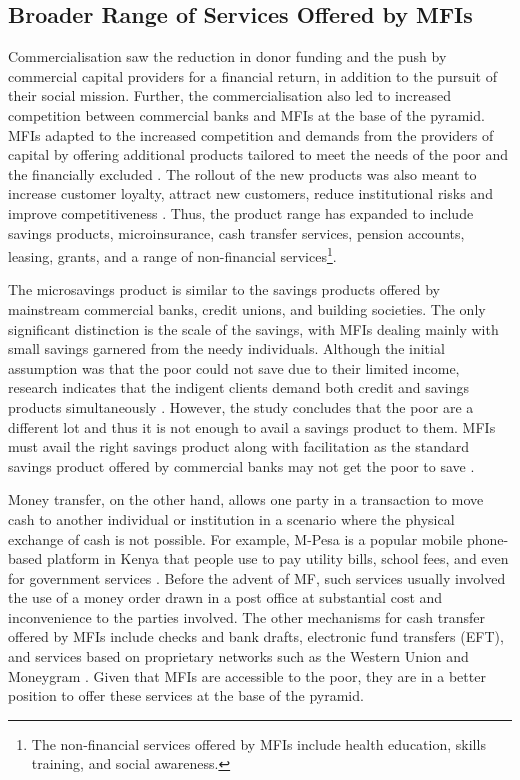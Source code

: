 \documentclass[a4paper, nobind]{templates/ociamthesis}
\begin{document}
\hypertarget{broader-range-of-services-offered-by-mfis}{%
\subsection{Broader Range of Services Offered by MFIs}\label{broader-range-of-services-offered-by-mfis}}

\noindent Commercialisation saw the reduction in donor funding and the push by commercial capital providers for a financial return, in addition to the pursuit of their social mission. Further, the commercialisation also led to increased competition between commercial banks and MFIs at the base of the pyramid. MFIs adapted to the increased competition and demands from the providers of capital by offering additional products tailored to meet the needs of the poor and the financially excluded \autocite{cozarenco2016type}. The rollout of the new products was also meant to increase customer loyalty, attract new customers, reduce institutional risks and improve competitiveness \autocite{churchill2012making}. Thus, the product range has expanded to include savings products, microinsurance, cash transfer services, pension accounts, leasing, grants, and a range of non-financial services\footnote{The non-financial services offered by MFIs include health education, skills training, and social awareness.}.

The microsavings product is similar to the savings products offered by mainstream commercial banks, credit unions, and building societies. The only significant distinction is the scale of the savings, with MFIs dealing mainly with small savings garnered from the needy individuals. Although the initial assumption was that the poor could not save due to their limited income, research indicates that the indigent clients demand both credit and savings products simultaneously \autocite{afzal2018two}. However, the study concludes that the poor are a different lot and thus it is not enough to avail a savings product to them. MFIs must avail the right savings product along with facilitation as the standard savings product offered by commercial banks may not get the poor to save \autocite{chandrasekhar2015microsavings}.

Money transfer, on the other hand, allows one party in a transaction to move cash to another individual or institution in a scenario where the physical exchange of cash is not possible. For example, M-Pesa is a popular mobile phone-based platform in Kenya that people use to pay utility bills, school fees, and even for government services \autocite{maake2015m}. Before the advent of MF, such services usually involved the use of a money order drawn in a post office at substantial cost and inconvenience to the parties involved. The other mechanisms for cash transfer offered by MFIs include checks and bank drafts, electronic fund transfers (EFT), and services based on proprietary networks such as the Western Union and Moneygram \autocite{ouma2017mobile}. Given that MFIs are accessible to the poor, they are in a better position to offer these services at the base of the pyramid.
\end{document}

